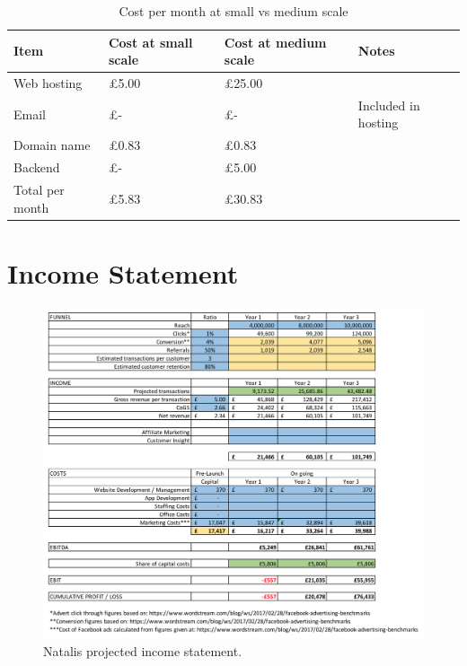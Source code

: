 \documentclass[10pt,a4paper]{article}
\begin{document}
\begin{appendices}
\begin{table}[]
	\centering
	\caption{Cost per month at small vs medium scale}
	\label{table:costpermonth}
	\begin{tabular}{llll}
		Item            & Cost at small scale & Cost at medium scale & Notes               \\ \hline
		Web hosting     & £5.00               & £25.00               &                     \\
		Email           & £-                  & £-                   & Included in hosting \\
		Domain name     & £0.83               & £0.83                &                     \\
		Backend         & £-                  & £5.00                &                     \\ \hline
		Total per month & £5.83               & £30.83               &
	\end{tabular}
\end{table}

\clearpage

\section{Income Statement}
\label{app:income_statement}
  \begin{figure}[!htb]
\includegraphics[width=1.0\linewidth]{income_statement.png}
    \caption{Natalis projected income statement.}
  \end{figure}



\end{appendices}
\end{document}
